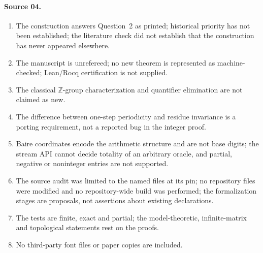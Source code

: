 \documentclass[11pt]{article}
\numberwithin{equation}{section}
\theoremstyle{definition}
\theoremstyle{remark}
\newcommand{\Z}{\mathbb Z}
\begin{document}
\paragraph{Source 04.}
\begin{enumerate}[label=04.\arabic*]
\item The construction answers Question~2 as printed; historical priority has
not been established; the literature check did not establish that the
construction has never appeared elsewhere.
\item The manuscript is unrefereed; no new theorem is represented as
machine-checked; Lean/Rocq certification is not supplied.
\item The classical $\Z$-group characterization and quantifier elimination
are not claimed as new.
\item The difference between one-step periodicity and residue invariance is a
porting requirement, not a reported bug in the integer proof.
\item Baire coordinates encode the arithmetic structure and are not base
digits; the stream API cannot decide totality of an arbitrary oracle, and
partial, negative or noninteger entries are not supported.
\item The source audit was limited to the named files at its pin; no
repository files were modified and no repository-wide build was performed;
the formalization stages are proposals, not assertions about existing
declarations.
\item The tests are finite, exact and partial; the model-theoretic,
infinite-matrix and topological statements rest on the proofs.
\item No third-party font files or paper copies are included.
\end{enumerate}
\end{document}
